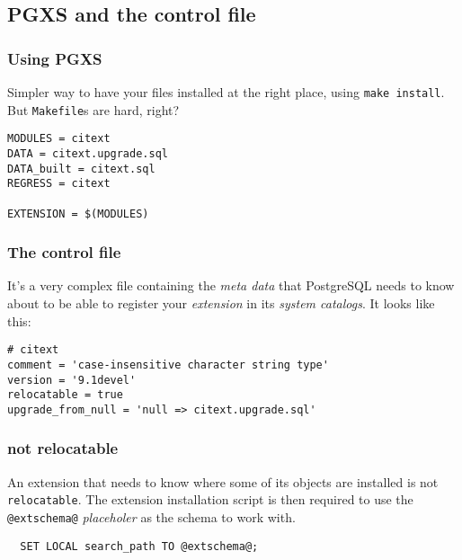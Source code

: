\documentclass[english]{beamer}
\begin{document}
\subsection{PGXS and the control file}

\begin{frame}[fragile]
  \frametitle{Using PGXS}

  Simpler way to have your files installed at the right place, using
  \texttt{make install}. But \texttt{Makefile}s are hard, right?
  \linebreak

  \begin{example}
\begin{verbatim}
MODULES = citext
DATA = citext.upgrade.sql
DATA_built = citext.sql
REGRESS = citext

EXTENSION = $(MODULES)
\end{verbatim}
  \end{example}
\end{frame}

\begin{frame}[fragile]
  \frametitle{The control file}

  It's a very complex file containing the \textit{meta data} that PostgreSQL
  needs to know about to be able to register your \textit{extension} in its
  \textit{system catalogs}. It looks like this:
  \linebreak

  \begin{example}
\begin{verbatim}
# citext
comment = 'case-insensitive character string type'
version = '9.1devel'
relocatable = true
upgrade_from_null = 'null => citext.upgrade.sql'
\end{verbatim}
  \end{example}
\end{frame}


\begin{frame}[fragile]
  \frametitle{not relocatable}

  An extension that needs to know where some of its objects are installed is
  not \texttt{relocatable}.  The extension installation script is then
  required to use the \texttt{@extschema@} \textit{placeholer} as the schema
  to work with.

  \begin{example}
\begin{verbatim}
  SET LOCAL search_path TO @extschema@;
\end{verbatim}
  \end{example}
\end{frame}
\end{document}

